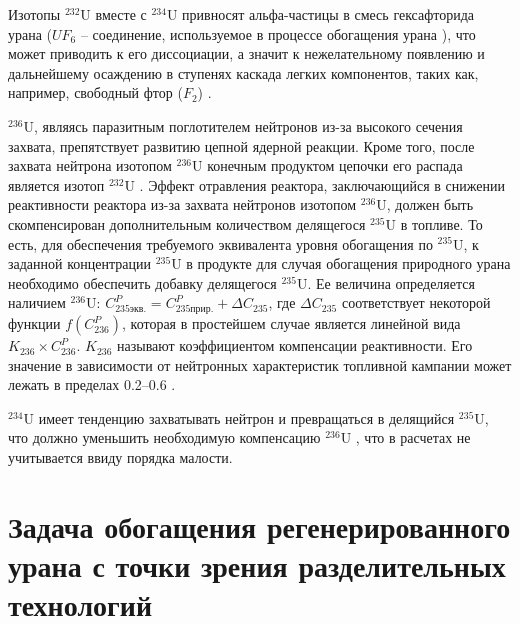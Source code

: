 Изотопы $^{232}$U вместе с $^{234}$U привносят альфа-частицы в смесь гексафторида урана ($UF_6$ -- соединение, используемое в процессе обогащения урана \cite{orlovWayObtainUranium2015, orlovDesublimationPurificationTransporting2017}), что может приводить к его диссоциации, а значит к нежелательному появлению и дальнейшему осаждению в ступенях каскада легких компонентов, таких как, например, свободный фтор ($F_2$) \cite{kryuchkovObogashchennyyUranDobavleniem2007, bernhardtRadiationEffectsAlpha1958, shmelevRazrabotkaRaschetnoyModeli2012}. 

$^{236}$U, являясь паразитным поглотителем нейтронов из-за высокого сечения захвата, препятствует развитию цепной ядерной реакции. Кроме того, после захвата нейтрона изотопом  $^{236}$U конечным продуктом цепочки его распада является изотоп  $^{232}$U \cite{ksenofontovIssledovanieProblemyVovlecheniya1988}.
Эффект отравления реактора, заключающийся в снижении реактивности реактора из-за захвата нейтронов изотопом  $^{236}$U, должен быть скомпенсирован дополнительным количеством делящегося $^{235}$U в топливе.
То есть, для обеспечения требуемого эквивалента уровня обогащения по $^{235}$U, к заданной концентрации $^{235}$U в продукте для случая обогащения природного урана необходимо обеспечить добавку делящегося $^{235}$U.
Ее величина определяется наличием $^{236}$U:
$C_{235 экв.}^{P}=C_{235 прир.}^{P}+\Delta C_{235}$, где $\Delta C_{235}$ соответствует некоторой функции $f\left(C_{236}^{P}\right)$, которая в простейшем случае является линейной вида $K_{236} \times C_{236}^{P}$. $K_{236}$ называют коэффициентом компенсации реактивности. Его значение в зависимости от нейтронных характеристик топливной кампании может лежать в пределах 0.2--0.6 \cite{delagarzaMulticomponentIsotopeSeparation1961, delculAnalysisReuseUranium2009}. 

$^{234}$U имеет тенденцию захватывать нейтрон и превращаться в делящийся $^{235}$U, что должно уменьшить необходимую компенсацию $^{236}$U \cite{dyachenkoIspolzovanieRegenerirovannogoUrana2012}, что в расчетах не учитывается ввиду порядка малости.


\section{Задача обогащения регенерированного урана с точки зрения разделительных технологий}


